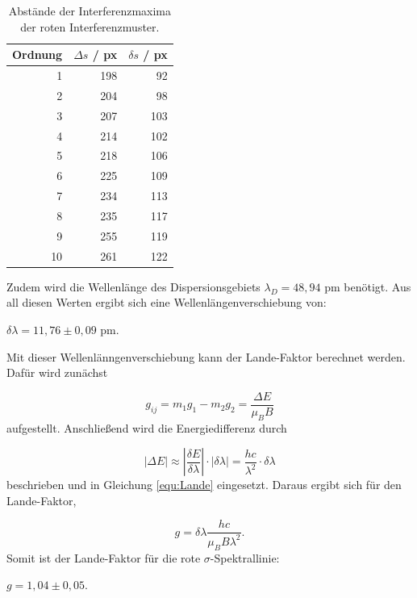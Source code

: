 \begin{table}
  \centering
  \footnotesize
  \caption{Abstände der Interferenzmaxima der roten Interferenzmuster.}
  \label{tab:Rot}

  \begin{tabular}{r r r}
    \toprule
    Ordnung & $\Delta s$ / px & $\delta s$ / px\\
    \midrule
    1   & 198 & 92  \\
    2   & 204 & 98  \\
    3   & 207 & 103 \\
    4   & 214 & 102 \\
    5   & 218 & 106 \\
    6   & 225 & 109 \\
    7   & 234 & 113 \\
    8   & 235 & 117 \\
    9   & 255 & 119 \\
    10  & 261 & 122 \\
    \bottomrule
  \end{tabular}
\end{table}

Zudem wird die Wellenlänge des Dispersionsgebiets $\lambda_D = 48,94$ pm benötigt.
Aus all diesen Werten ergibt sich eine Wellenlängenverschiebung von: \\

\begin{center}
$\delta \lambda = 11,76 \pm 0,09$ pm. \\
\end{center}
Mit dieser Wellenlänngenverschiebung kann der Lande-Faktor berechnet werden.
Dafür wird zunächst

\begin{equation}
  \label{equ:Lande}
  g_{ij} = m_1 g_1 - m_2 g_2 = \frac{\Delta E }{\mu_B B}
\end{equation}
aufgestellt.
Anschließend wird die Energiedifferenz durch 

\begin{equation}
  |\Delta E| \approx \left | \frac{\delta E}{\delta \lambda} \right | \cdot |\delta \lambda | = \frac{h c}{\lambda^2} \cdot \delta \lambda
\end{equation}
beschrieben und in Gleichung \eqref{equ:Lande} eingesetzt.
Daraus ergibt sich für den Lande-Faktor,

\begin{equation}
  g = \delta \lambda \frac{hc}{\mu_B B \lambda^2}.
\end{equation}
Somit ist der Lande-Faktor für die rote $\sigma$-Spektrallinie:\\
\begin{center}
$g = 1,04 \pm 0,05$.
\end{center}


